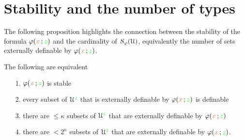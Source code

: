   
  
  
  


\section{Stability and the number of types}


The following proposition highlights the connection between the stability of the formula $\varphi({\color{brown} x}\,;{\color{green} z})$ and the cardinality of $S_\varphi(\EuScript U)$, equivalently the number of sets externally definable by $\varphi({\color{brown} x}\,;{\color{green} z})$. 

\begin{theorem}\label{thm_def_stable_formula2}
  The following are equivalent
  \begin{itemize}
  \item[1.] $\varphi({\color{brown} x}\,;{\color{green} z})$ is stable
  \item[2.] every subset of $\EuScript U^{\color{green} z}$ that is externally definable by $\varphi({\color{brown} x}\,;{\color{green} z})$ is definable
  \item[3.] there are $\le\kappa$ subsets of $\EuScript U^{\color{green} z}$ that are externally definable by $\varphi({\color{brown} x}\,;{\color{green} z})$
  \item[4.] there are $<2^\kappa$ subsets of $\EuScript U^{\color{green} z}$ that are externally definable by $\varphi({\color{brown} x}\,;{\color{green} z})$.
  \end{itemize}
\end{theorem}


